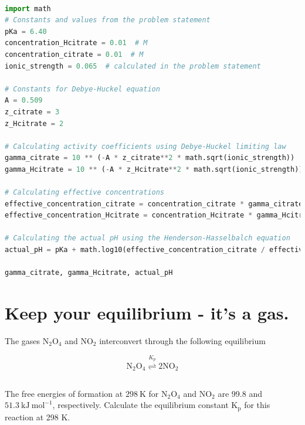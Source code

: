 \documentclass[12pt]{article}
\begin{document}
\begin{lstlisting}[language=Python]

import math
# Constants and values from the problem statement
pKa = 6.40
concentration_Hcitrate = 0.01  # M
concentration_citrate = 0.01  # M
ionic_strength = 0.065  # calculated in the problem statement

# Constants for Debye-Huckel equation
A = 0.509
z_citrate = 3
z_Hcitrate = 2

# Calculating activity coefficients using Debye-Huckel limiting law
gamma_citrate = 10 ** (-A * z_citrate**2 * math.sqrt(ionic_strength))
gamma_Hcitrate = 10 ** (-A * z_Hcitrate**2 * math.sqrt(ionic_strength))

# Calculating effective concentrations
effective_concentration_citrate = concentration_citrate * gamma_citrate
effective_concentration_Hcitrate = concentration_Hcitrate * gamma_Hcitrate

# Calculating the actual pH using the Henderson-Hasselbalch equation
actual_pH = pKa + math.log10(effective_concentration_citrate / effective_concentration_Hcitrate)

gamma_citrate, gamma_Hcitrate, actual_pH

\end{lstlisting}

\section{Keep your equilibrium - it's a gas.}
The gases $\mathrm{N}_{2} \mathrm{O}_{4}$ and $\mathrm{NO}_{2}$ interconvert through the following equilibrium

$$
\mathrm{N}_{2} \mathrm{O}_{4} \stackrel{K_{p}}{\rightleftharpoons} 2 \mathrm{NO}_{2}
$$
\subsection{}

The free energies of formation at $298 \mathrm{~K}$ for $\mathrm{N}_{2} \mathrm{O}_{4}$ and $\mathrm{NO}_{2}$ are 99.8 and $51.3 \mathrm{~kJ} \mathrm{~mol}^{-1}$, respectively. Calculate the equilibrium constant $\mathrm{K}_{\mathrm{p}}$ for this reaction at 298 K.
\end{document}
